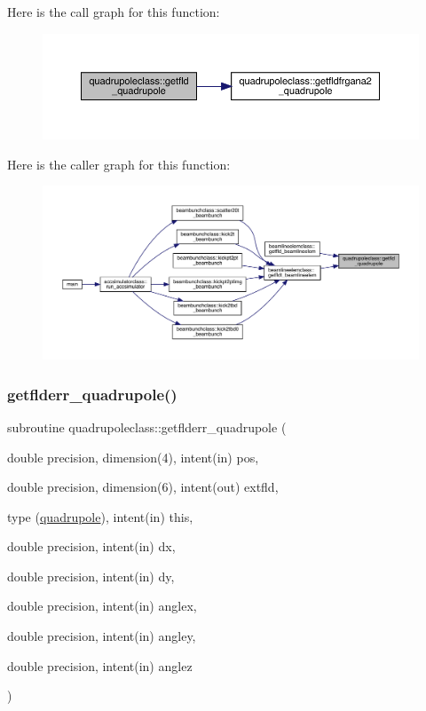 Here is the call graph for this function\+:\nopagebreak
\begin{figure}[H]
\begin{center}
\leavevmode
\includegraphics[width=350pt]{namespacequadrupoleclass_a1d1bf0b4ea88a1cd0c0832a178fc80e5_cgraph}
\end{center}
\end{figure}
Here is the caller graph for this function\+:\nopagebreak
\begin{figure}[H]
\begin{center}
\leavevmode
\includegraphics[width=350pt]{namespacequadrupoleclass_a1d1bf0b4ea88a1cd0c0832a178fc80e5_icgraph}
\end{center}
\end{figure}
\mbox{\label{namespacequadrupoleclass_a41791f03ec33f0255e54ebc7b9519170}} 
\subsubsection{\texorpdfstring{getflderr\_quadrupole()}{getflderr\_quadrupole()}}
{\footnotesize\ttfamily subroutine quadrupoleclass\+::getflderr\+\_\+quadrupole (\begin{DoxyParamCaption}\item[{double precision, dimension(4), intent(in)}]{pos,  }\item[{double precision, dimension(6), intent(out)}]{extfld,  }\item[{type (\mbox{\hyperlink{namespacequadrupoleclass_structquadrupoleclass_1_1quadrupole}{quadrupole}}), intent(in)}]{this,  }\item[{double precision, intent(in)}]{dx,  }\item[{double precision, intent(in)}]{dy,  }\item[{double precision, intent(in)}]{anglex,  }\item[{double precision, intent(in)}]{angley,  }\item[{double precision, intent(in)}]{anglez }\end{DoxyParamCaption})}



